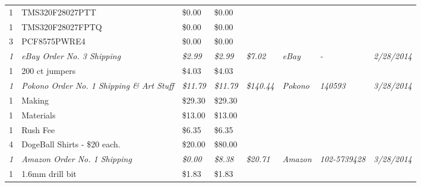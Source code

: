 \begin{table}[h]
{\begin{tabular}{llllllll}
1            & TMS320F28027PTT                                   & \$0.00           & \$0.00           &                   &                   &                       &                     \\
1            & TMS320F28027FPTQ                                  & \$0.00           & \$0.00           &                   &                   &                       &                     \\
3            & PCF8575PWRE4                                      & \$0.00           & \$0.00           &                   &                   &                       &                     \\  \hline \hline
\textit{1}   & \textit{eBay Order No. 3 Shipping}                & \textit{\$2.99}  & \textit{\$2.99}  & \textit{\$7.02}   & \textit{eBay}     & \textit{-}            & \textit{2/28/2014}  \\
1            & 200 ct jumpers                                    & \$4.03           & \$4.03           &                   &                   &                       &                     \\  \hline \hline
\textit{1}   & \textit{Pokono Order No. 1 Shipping \& Art Stuff} & \textit{\$11.79} & \textit{\$11.79} & \textit{\$140.44} & \textit{Pokono}   & \textit{140593}       & \textit{3/28/2014}  \\
1            & Making                                            & \$29.30          & \$29.30          &                   &                   &                       &                     \\
1            & Materials                                         & \$13.00          & \$13.00          &                   &                   &                       &                     \\
1            & Rush Fee                                          & \$6.35           & \$6.35           &                   &                   &                       &                     \\
4            & DogeBall Shirts - \$20 each.                      & \$20.00          & \$80.00          &                   &                   &                       &                     \\  \hline \hline
\textit{1}   & \textit{Amazon Order No. 1 Shipping}              & \textit{\$0.00}  & \textit{\$8.38}  & \textit{\$20.71}  & \textit{Amazon}   & \textit{102-5739428}  & \textit{3/28/2014}  \\
1            & 1.6mm drill bit                                   & \$1.83           & \$1.83           &                   &                   &                       &                     \\

\end{tabular}}
\end{table}
